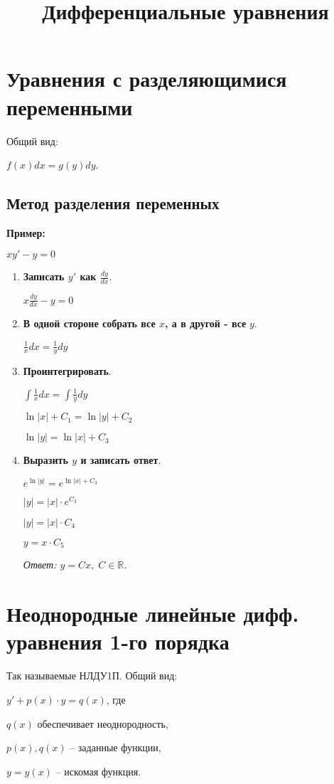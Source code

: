 \documentclass[10pt, a4paper]{article}
\title{Дифференциальные уравнения}
\author{}
\date{}
\begin{document}
\maketitle

\tableofcontents

\newpage

\section{Уравнения с разделяющимися переменными}
Общий вид:
\par $f(x)dx = g(y)dy$.

\subsection{Метод разделения переменных}
\textbf{Пример:}
\par $xy' - y = 0$
\begin{enumerate}
    \item \textbf{Записать $y'$ как $\frac{dy}{dx}$}.
        \par $x\frac{dy}{dx} - y = 0$
    \item \textbf{В одной стороне собрать все $x$, а в другой - все} $y$.
        \par $\frac{1}{x}dx = \frac{1}{y}dy$
    \item \textbf{Проинтегрировать}.
        \par $\int\frac{1}{x}dx = \int\frac{1}{y}dy$
        \par $\ln|x| + C_{1} = \ln|y| + C_{2}$
        \par $\ln|y| = \ln|x| + C_{3}$
    \item \textbf{Выразить $y$ и записать ответ}.
        \par $e^{\ln|y|} = e^{\ln|x| + C_{3}}$
        \par $|y| = |x| \cdot e^{C_{3}}$
        \par $|y| = |x| \cdot C_{4}$
        \par $y = x \cdot C_{5}$
        \par \textit{Ответ: $y = Cx,\;C \in \mathbb{R}$.}
\end{enumerate}


\section{Неоднородные линейные дифф. уравнения 1-го порядка}
Так называемые НЛДУ1П.
\newline
Общий вид:
\par $y' + p(x) \cdot y = q(x)$, где
\par $q(x)$ обеспечивает неоднородность,
\par $p(x), q(x)$ -- заданные функции,
\par $y = y(x)$ -- искомая функция.
\end{document}
